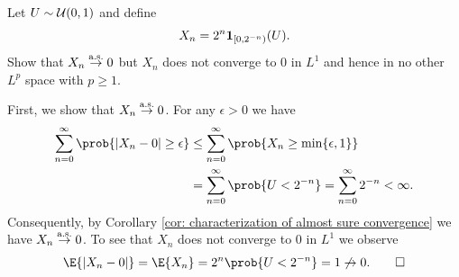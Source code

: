 
\begin{exercise}[subtitle={Almost sure but not \(L^p\) convergence \Coffeecup}]
    \label{ex: as but not Lp}
    Let \(U\sim \mathcal{U}(0,1)\) and define
    \[
        X_n = 2^n \ind{[0, 2^{-n})}(U).
    \]
    Show that \(X_n \overset{\operatorname{\text{a.s.}}}\to 0\) but \(X_n\) does not converge to \(0\)
    in \(L^1\) and hence in no other \(L^p\) space with \(p \ge 1\).
\end{exercise}

\begin{solution}
    First, we show that \(X_n \overset{\operatorname{\text{a.s.}}}\to 0\). For any \(\epsilon > 0\)
    we have
    \[\begin{aligned}
        \sum_{n=0}^\infty \prob{\abs{X_n - 0} \ge \epsilon}
        &\le \sum_{n=0}^\infty \prob{X_n \ge \min\set{\epsilon, 1}}
        \\
        &= \sum_{n=0}^\infty\prob{U < 2^{-n}} = \sum_{n=0}^\infty 2^{-n} < \infty.
    \end{aligned}
    \]
    Consequently, by Corollary \ref{cor: characterization of almost sure convergence} we have \(X_n \overset{\operatorname{\text{a.s.}}}\to 0\).
    To see that \(X_n\) does not converge to \(0\) in \(L^1\) we observe
    \[
        \E{\abs{X_n - 0}}
        = \E{X_n}
        = 2^n \prob{U < 2^{-n}} = 1
        \not\to 0.
        \qedhere
    \]
\end{solution}
